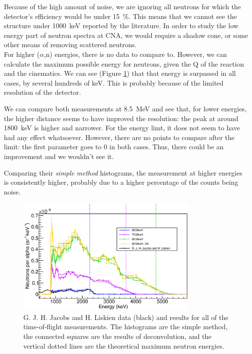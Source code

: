 \documentclass[a4paper,12pt]{report}
\newcommand{\an}{($\alpha$,n) }
\begin{document}
Because of the high amount of noise, we are ignoring all neutrons for which the detector's efficiency would be under \qty{15}{\percent}.
This means that we cannot see the structure under \qty{1000}{\keV} reported by the literature.
In order to study the low energy part of neutron spectra at CNA, we would require a shadow cone, or some other means of removing scattered neutrons.
\\

For higher \an energies, there is no data to compare to.
However, we can calculate the maximum possible energy for neutrons, given the Q of the reaction and the cinematics.
We can see (Figure \ref{pulsed_results}) that that energy is surpassed in all cases, by several hundreds of \unit{\keV}.
This is probably because of the limited resolution of the detector.

We can compare both measurements at \qty{8.5}{\MeV} and see that, for lower energies, the higher distance seems to have improved the resolution: the peak at around \qty{1800}{\keV} is higher and narrower.
For the energy limt, it does not seem to have had any effect whatsoever.
However, there are no points to compare after the limit: the first parameter goes to 0 in both cases.
Thus, there could be an improvement and we wouldn't see it.

Comparing their \textit{simple method} histograms, the measurement at higher energies is consistently higher, probably due to a higher percentage of the counts being noise.
\\

\begin{figure}[H]
	\centering
	\includegraphics[width=0.80\textwidth]{pulsed_results.eps}
	\caption{G. J. H. Jacobs and H. Liskien data (black) and results for all of the time-of-flight measurements.
	The histograms are the simple method, the connected squares are the results of deconvolution, and the vertical dotted lines are the theoretical maximum neutron energies.}
	\label{pulsed_results}
\end{figure}
\end{document}
